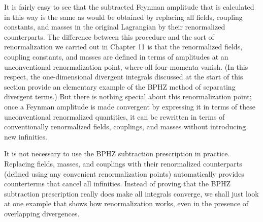 It is fairly easy to see that the subtracted Feynman amplitude that is
calculated in this way is the same as would be obtained by replacing all
fields, coupling constants, and masses in the original Lagrangian by their
renormalized counterparts. The difference between this procedure and the
sort of renormalization we carried out in Chapter 11 is that the renormalized
fields, coupling constants, and masses are defined in terms of amplitudes at
an unconventional renormalization point, where all four-momenta vanish. (In
this respect, the one-dimensional divergent integrals discussed at the start
of this section provide an elementary example of the BPHZ method of
separating divergent terms.) But there is nothing special about this
renormalization point; once a Feynman amplitude is made convergent by
expressing it in terms of these unconventional renormalized quantities, it
can be rewritten in terms of conventionally renormalized fields, couplings,
and masses without introducing new infinities.

It is not necessary to use the BPHZ subtraction prescription in practice.
Replacing fields, masses, and couplings with their renormalized counterparts
(defined using any convenient renormalization points) automatically provides
counterterms that cancel all infinities. Instead of proving that the BPHZ
subtraction prescription really does make all integrals converge, we shall
just look at one example that shows how renormalization works, even in the
presence of overlapping divergences.

